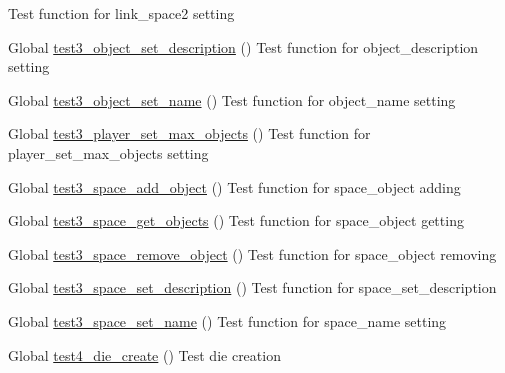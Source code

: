 \begin{DoxyRefList}
%
Test function for link\+\_\+space2 setting  
\item[Global \mbox{\hyperlink{object__test_8h_a63ff7a162ef166d51f3f59ce7be4c46e}{test3\+\_\+object\+\_\+set\+\_\+description}} ()]\label{test__test000107}%
%
Test function for object\+\_\+description setting  
\item[Global \mbox{\hyperlink{object__test_8h_ab40669b5d083b6484197d917fb6882b1}{test3\+\_\+object\+\_\+set\+\_\+name}} ()]\label{test__test000102}%
%
Test function for object\+\_\+name setting  
\item[Global \mbox{\hyperlink{player__test_8c_aa40042cc9c7916afea057534cf1180a6}{test3\+\_\+player\+\_\+set\+\_\+max\+\_\+objects}} ()]\label{test__test000158}%
%
Test function for player\+\_\+set\+\_\+max\+\_\+objects setting  
\item[Global \mbox{\hyperlink{space__test_8c_ac6abb97e2aa0f1dd44d47732adcf6329}{test3\+\_\+space\+\_\+add\+\_\+object}} ()]\label{test__test000190}%
%
Test function for space\+\_\+object adding  
\item[Global \mbox{\hyperlink{space__test_8c_afaef8bd20a432920a4ffc66ad1ea7ba1}{test3\+\_\+space\+\_\+get\+\_\+objects}} ()]\label{test__test000203}%
%
Test function for space\+\_\+object getting  
\item[Global \mbox{\hyperlink{space__test_8c_a57abe29562a523c41c966b9a656887b8}{test3\+\_\+space\+\_\+remove\+\_\+object}} ()]\label{test__test000206}%
%
Test function for space\+\_\+object removing  
\item[Global \mbox{\hyperlink{space__test_8c_a2599e2fdd9abd61c410faeca649402e6}{test3\+\_\+space\+\_\+set\+\_\+description}} ()]\label{test__test000219}%
%
Test function for space\+\_\+set\+\_\+description  
\item[Global \mbox{\hyperlink{space__test_8c_aa24a337830006e33706ab6ac1c416b47}{test3\+\_\+space\+\_\+set\+\_\+name}} ()]\label{test__test000177}%
%
Test function for space\+\_\+name setting  
\item[Global \mbox{\hyperlink{die__test_8c_a3f2b94996d08d5e9fc2a7c6548519b1b}{test4\+\_\+die\+\_\+create}} ()]\label{test__test000004}%
%
Test die creation 
\end{DoxyRefList}